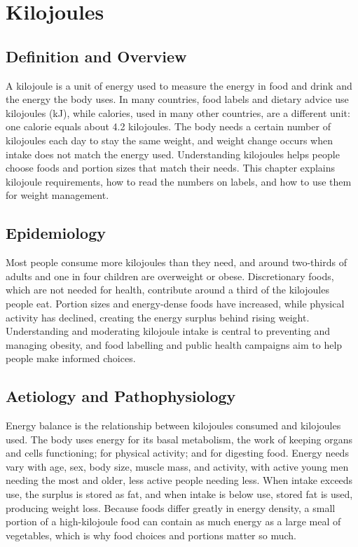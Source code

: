 \chapter{Kilojoules}

\section*{Definition and Overview}
A kilojoule is a unit of energy used to measure the energy in food and drink and the energy the body uses. In many countries, food labels and dietary advice use kilojoules (kJ), while calories, used in many other countries, are a different unit: one calorie equals about 4.2 kilojoules. The body needs a certain number of kilojoules each day to stay the same weight, and weight change occurs when intake does not match the energy used. Understanding kilojoules helps people choose foods and portion sizes that match their needs. This chapter explains kilojoule requirements, how to read the numbers on labels, and how to use them for weight management.

\section*{Epidemiology}
Most people consume more kilojoules than they need, and around two-thirds of adults and one in four children are overweight or obese. Discretionary foods, which are not needed for health, contribute around a third of the kilojoules people eat. Portion sizes and energy-dense foods have increased, while physical activity has declined, creating the energy surplus behind rising weight. Understanding and moderating kilojoule intake is central to preventing and managing obesity, and food labelling and public health campaigns aim to help people make informed choices.

\section*{Aetiology and Pathophysiology}
Energy balance is the relationship between kilojoules consumed and kilojoules used. The body uses energy for its basal metabolism, the work of keeping organs and cells functioning; for physical activity; and for digesting food. Energy needs vary with age, sex, body size, muscle mass, and activity, with active young men needing the most and older, less active people needing less. When intake exceeds use, the surplus is stored as fat, and when intake is below use, stored fat is used, producing weight loss. Because foods differ greatly in energy density, a small portion of a high-kilojoule food can contain as much energy as a large meal of vegetables, which is why food choices and portions matter so much.

